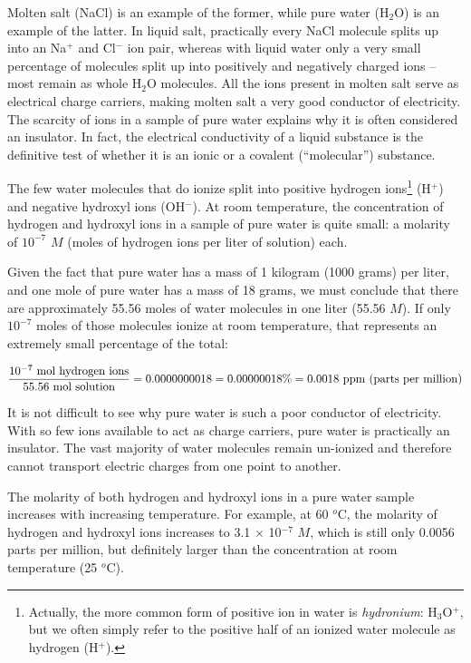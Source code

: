 Molten salt (NaCl) is an example of the former, while pure water (H$_{2}$O) is an example of the latter.  In liquid salt, practically every NaCl molecule splits up into an Na$^{+}$ and Cl$^{-}$ ion pair, whereas with liquid water only a very small percentage of molecules split up into positively and negatively charged ions -- most remain as whole H$_{2}$O molecules.  All the ions present in molten salt serve as electrical charge carriers, making molten salt a very good conductor of electricity.  The scarcity of ions in a sample of pure water explains why it is often considered an insulator.  In fact, the electrical conductivity of a liquid substance is the definitive test of whether it is an ionic or a covalent (``molecular'') substance.      

The few water molecules that do ionize split into positive hydrogen ions\footnote{Actually, the more common form of positive ion in water is \textit{hydronium}: H$_{3}$O$^{+}$, but we often simply refer to the positive half of an ionized water molecule as hydrogen (H$^{+}$).} (H$^{+}$) and negative hydroxyl ions (OH$^{-}$).  At room temperature, the concentration of hydrogen and hydroxyl ions in a sample of pure water is quite small: a molarity of $10^{-7}$ $M$ (moles of hydrogen ions per liter of solution) each.    

Given the fact that pure water has a mass of 1 kilogram (1000 grams) per liter, and one mole of pure water has a mass of 18 grams, we must conclude that there are approximately 55.56 moles of water molecules in one liter (55.56 $M$).  If only $10^{-7}$ moles of those molecules ionize at room temperature, that represents an extremely small percentage of the total:

$${10^{-7} \hbox{ mol hydrogen ions} \over 55.56 \hbox{ mol solution}} = 0.0000000018 = 0.00000018 \% = 0.0018 \hbox{ ppm (parts per million)}$$

It is not difficult to see why pure water is such a poor conductor of electricity.  With so few ions available to act as charge carriers, pure water is practically an insulator.  The vast majority of water molecules remain un-ionized and therefore cannot transport electric charges from one point to another.

The molarity of both hydrogen and hydroxyl ions in a pure water sample increases with increasing temperature.  For example, at 60 $^{o}$C, the molarity of hydrogen and hydroxyl ions increases to 3.1 $\times$ 10$^{-7}$ $M$, which is still only 0.0056 parts per million, but definitely larger than the concentration at room temperature (25 $^{o}$C).   

